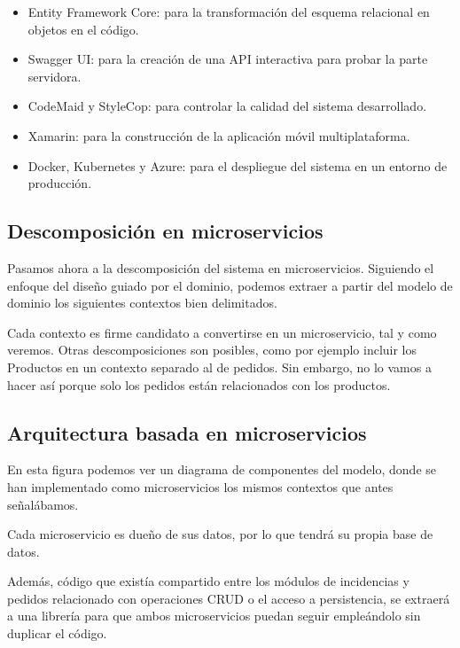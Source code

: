 \documentclass[11pt,a4paper]{article}
\begin{document}
\begin{itemize}

\item Entity Framework Core: para la transformación del esquema relacional en objetos en el código.

\item Swagger UI: para la creación de una API interactiva para probar la parte servidora.

\item CodeMaid y StyleCop: para controlar la calidad del sistema desarrollado.

\item Xamarin: para la construcción de la aplicación móvil multiplataforma.

\item Docker, Kubernetes y Azure: para el despliegue del sistema en un entorno de producción.

\end{itemize}

\subsection{Descomposición en microservicios}

Pasamos ahora a la descomposición del sistema en microservicios. Siguiendo el enfoque del diseño guiado por el dominio, podemos extraer a partir del modelo de dominio los siguientes contextos bien delimitados.

Cada contexto es firme candidato a convertirse en un microservicio, tal y como veremos. Otras descomposiciones son posibles, como por ejemplo incluir los Productos en un contexto separado al de pedidos. Sin embargo, no lo vamos a hacer así porque solo los pedidos están relacionados con los productos.

\subsection{Arquitectura basada en microservicios}

En esta figura podemos ver un diagrama de componentes del modelo, donde se han implementado como microservicios los mismos contextos que antes señalábamos.

Cada microservicio es dueño de sus datos, por lo que tendrá su propia base de datos. 

Además, código que existía compartido entre los módulos de incidencias y pedidos relacionado con operaciones CRUD o el acceso a persistencia, se extraerá a una librería para que ambos microservicios puedan seguir empleándolo sin duplicar el código.
\end{document}
